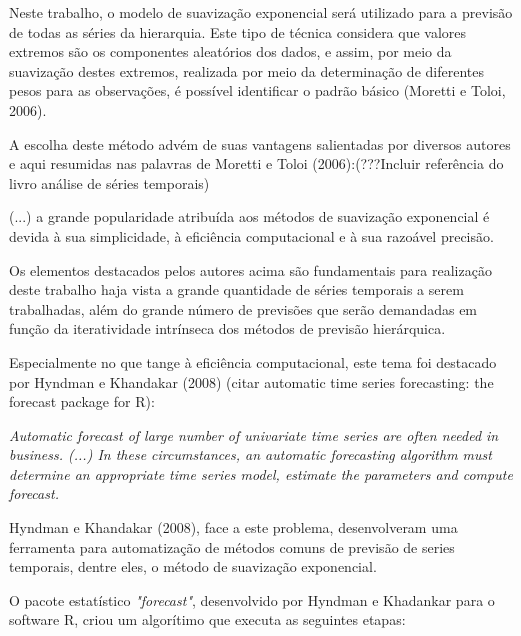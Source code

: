 \documentclass[
	12pt,				%
	openright,			%
	twoside,			%
	a4paper,			%
	english,			%
	french,				%
	spanish,			%
	brazil				%
	]{abntex2}
\begin{document}

Neste trabalho, o modelo de suavização exponencial será utilizado para a previsão de todas as séries da hierarquia. Este tipo de técnica considera que valores extremos são os componentes aleatórios dos dados, e assim, por meio da suavização destes extremos, realizada por meio da determinação de diferentes pesos para as observações, é possível identificar o padrão básico (Moretti e Toloi, 2006). 

A escolha deste método advém de suas vantagens salientadas por diversos autores e aqui resumidas nas palavras de Moretti e Toloi (2006):(???Incluir referência do livro análise de séries temporais)

\begin{citacao}
(...) a grande popularidade atribuída aos métodos de suavização exponencial é devida à sua simplicidade, à eficiência computacional e à sua razoável precisão.
\end{citacao}

Os elementos destacados pelos autores acima são fundamentais para realização deste trabalho haja vista a grande quantidade de séries temporais a serem trabalhadas, além do grande número de previsões que serão demandadas em função da iteratividade intrínseca dos métodos de previsão hierárquica.

Especialmente no que tange à eficiência computacional, este tema foi destacado por Hyndman e Khandakar (2008) (citar automatic time series forecasting: the forecast package for R):

\begin{citacao}
\emph{Automatic forecast of large number of univariate time series are often needed in business. (...) In these circumstances, an automatic forecasting algorithm must determine an appropriate time series model, estimate the parameters and compute forecast.}
\end{citacao}

Hyndman e Khandakar (2008), face a este problema, desenvolveram uma ferramenta para automatização de métodos comuns de previsão de series temporais, dentre eles, o método de suavização exponencial. 

O pacote estatístico \emph{"forecast"}, desenvolvido por Hyndman e Khadankar para o software R, criou um algorítimo que executa as seguintes etapas:
\end{document}
